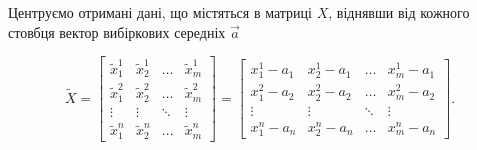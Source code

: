 Центруємо отримані дані, що містяться в матриці $X$, віднявши від кожного
стовбця вектор вибіркових середніх $\vec{a}$
\begin{comment}
\begin{equation*}
  \tilde{x}_k^i = x_k^i - a_i,\qquad k = \overline{1,m}, i = \overline{1,n}.
\end{equation*}
Кожен стовбець матриці вимірювань прийме вигляд
\begin{equation*}
  \tilde{X}_k
  = \vec{X}_k - \vec{a}
  = \begin{bmatrix}
    x_k^1 - a_1 \\
    x_k^2 - a_2 \\
    \vdots      \\
    x_k^n - a_n
  \end{bmatrix},
  \qquad k = \overline{1,m}.
\end{equation*}
Маємо матрицю центрованих вимірювань $\tilde{X}$
\end{comment}
\begin{equation*}
  \tilde{X}
  = \begin{bmatrix}
    \tilde{x}_1^1  & \tilde{x}_2^1  & \dots  & \tilde{x}_m^1  \\
    \tilde{x}_1^2  & \tilde{x}_2^2  & \dots  & \tilde{x}_m^2  \\
    \vdots & \vdots & \ddots & \vdots \\
    \tilde{x}_1^n  & \tilde{x}_2^n  & \dots  & \tilde{x}_m^n
  \end{bmatrix}
  = \begin{bmatrix}
    x_1^1 - a_1  & x_2^1 - a_1  & \dots  & x_m^1 - a_1 \\
    x_1^2 - a_2  & x_2^2 - a_2  & \dots  & x_m^2 - a_2 \\
    \vdots       & \vdots       & \ddots & \vdots      \\
    x_1^n - a_n  & x_2^n - a_n  & \dots  & x_m^n - a_n
  \end{bmatrix}.
\end{equation*}

